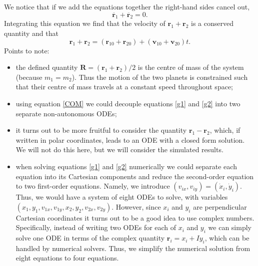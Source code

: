 \documentclass[]{article}
\newcommand{\bb}{\begin{equation}}
\newcommand{\ee}{\end{equation}}
\newcommand{\eqn}[1]{equation \eqref{#1}}
\newcommand{\eqns}[2]{equations \eqref{#1} and \eqref{#2}}
\begin{document}
\begin{enumerate}
We notice that if we add the equations together the right-hand sides cancel out,
\bb
\ddot{\bm{r}_1}+\ddot{\bm{r}_2}=0.
\ee
Integrating this equation we find that the velocity of $\bm{r}_1+\bm{r}_2$ is a conserved quantity and that
\bb
\bm{r}_1+\bm{r}_2=(\bm{r}_{10}+\bm{r}_{20})+(\bm{v}_{10}+\bm{v}_{20})t.\label{COM}
\ee
Points to note:
\begin{itemize}
\item the defined quantity $\bm{R}=(\bm{r}_1+\bm{r}_2)/2$ is the centre of mass of the system (because $m_1=m_2$). Thus the motion of the two planets is constrained such that their centre of mass travels at a constant speed throughout space;
\item using \eqn{COM} we could decouple \eqns{g1}{g2} into two separate non-autonomous ODEs;
\item it turns out to be more fruitful to consider the quantity $\bm{r}_1-\bm{r}_2$, which, if written in polar coordinates, leads to an ODE with a closed form solution. We will not do this here, but we will consider the simulated results.
\item when solving \eqns{g1}{g2} numerically we could separate each equation into its Cartesian components and reduce the second-order equation to two first-order equations. Namely, we introduce $(v_{ix},v_{iy})=(\dot{x}_i,\dot{y}_i)$. Thus, we would have a system of eight ODEs to solve, with variables $(x_1,y_1,v_{1x},v_{1y},x_2,y_2,v_{2x},v_{2y})$. However, since $x_i$ and $y_i$ are perpendicular Cartesian coordinates it turns out to be a good idea to use complex numbers. Specifically, instead of writing two ODEs for each of $x_i$ and $y_i$ we can simply solve one ODE in terms of the complex quantity $\bm{r}_i=x_i+Iy_i$, which can be handled by numerical solvers. Thus, we simplify the numerical solution from eight equations to four equations.
\end{itemize}

\end{enumerate}
\end{document}
